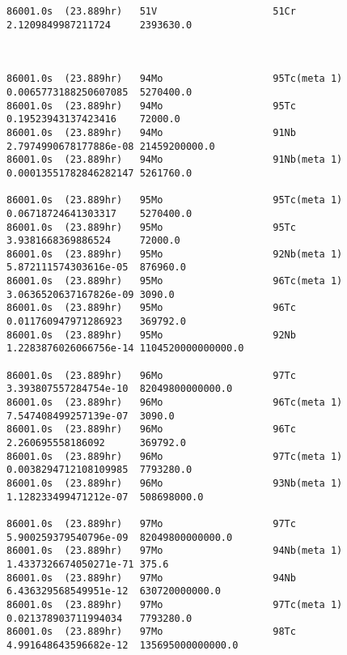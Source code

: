 \begin{lstlisting}[style=sOutputFile,caption={Final results for steel irradiation},label={listing:alexsteel}]
86001.0s  (23.889hr)   51V                    51Cr                   2.1209849987211724     2393630.0             



86001.0s  (23.889hr)   94Mo                   95Tc(meta 1)           0.0065773188250607085  5270400.0             
86001.0s  (23.889hr)   94Mo                   95Tc                   0.19523943137423416    72000.0               
86001.0s  (23.889hr)   94Mo                   91Nb                   2.7974990678177886e-08 21459200000.0         
86001.0s  (23.889hr)   94Mo                   91Nb(meta 1)           0.00013551782846282147 5261760.0             

86001.0s  (23.889hr)   95Mo                   95Tc(meta 1)           0.06718724641303317    5270400.0             
86001.0s  (23.889hr)   95Mo                   95Tc                   3.9381668369886524     72000.0               
86001.0s  (23.889hr)   95Mo                   92Nb(meta 1)           5.872111574303616e-05  876960.0              
86001.0s  (23.889hr)   95Mo                   96Tc(meta 1)           3.0636520637167826e-09 3090.0                
86001.0s  (23.889hr)   95Mo                   96Tc                   0.011760947971286923   369792.0              
86001.0s  (23.889hr)   95Mo                   92Nb                   1.2283876026066756e-14 1104520000000000.0    

86001.0s  (23.889hr)   96Mo                   97Tc                   3.393807557284754e-10  82049800000000.0      
86001.0s  (23.889hr)   96Mo                   96Tc(meta 1)           7.547408499257139e-07  3090.0                
86001.0s  (23.889hr)   96Mo                   96Tc                   2.260695558186092      369792.0              
86001.0s  (23.889hr)   96Mo                   97Tc(meta 1)           0.0038294712108109985  7793280.0             
86001.0s  (23.889hr)   96Mo                   93Nb(meta 1)           1.128233499471212e-07  508698000.0           

86001.0s  (23.889hr)   97Mo                   97Tc                   5.900259379540796e-09  82049800000000.0      
86001.0s  (23.889hr)   97Mo                   94Nb(meta 1)           1.4337326674050271e-71 375.6                 
86001.0s  (23.889hr)   97Mo                   94Nb                   6.436329568549951e-12  630720000000.0        
86001.0s  (23.889hr)   97Mo                   97Tc(meta 1)           0.021378903711994034   7793280.0             
86001.0s  (23.889hr)   97Mo                   98Tc                   4.991648643596682e-12  135695000000000.0     






\end{lstlisting}
